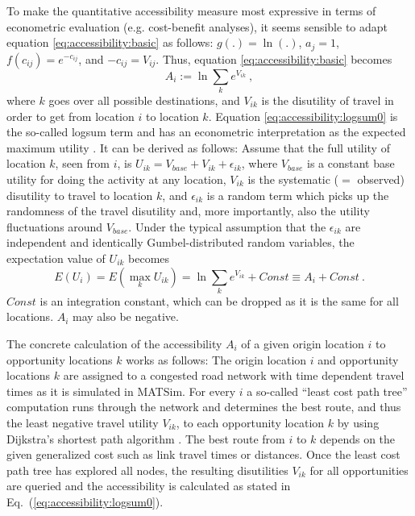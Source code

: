 To make the quantitative accessibility measure most expressive in terms of econometric evaluation (e.g. cost-benefit analyses), it seems sensible to adapt equation \ref{eq:accessibility:basic} as follows: $g(.) = \ln(.)$, $a_j = 1$, $f(c_{ij}) = e^{-c_{ij}}$, and $-c_{ij} = V_{ij}$. Thus, equation \ref{eq:accessibility:basic} becomes
\begin{equation}
A_i := \ln \sum_k e^{V_{ik}} \ ,
\label{eq:accessibility:logsum0}
\end{equation}
where $k$ goes over all possible destinations, and $V_{ik}$ is the
disutility of travel in order to get from location $i$ to location
$k$. Equation \ref{eq:accessibility:logsum0} is the so-called logsum term and has an econometric interpretation as the expected maximum utility \citep[e.g.][]{Ben-AkivaBook}. It can be derived as follows: Assume that the full utility of location $k$, seen from $i$, is $U_{ik} = V_{base} + V_{ik} + \epsilon_{ik}$, where $V_{base}$ is a constant base utility for doing the activity at any location, $V_{ik}$ is the systematic ($=$ observed) disutility to travel to location $k$, and $\epsilon_{ik}$ is a random term which picks up the randomness of the travel disutility and, more importantly, also the utility fluctuations around $V_{base}$.  Under the typical assumption that the $\epsilon_{ik}$ are independent and identically Gumbel-distributed random variables, the expectation value of $U_{ik}$ becomes
\begin{equation}
E(U_i) = E(\max_k U_{ik}) = \ln \sum_k e^{V_{ik}} + Const \equiv A_i + Const \ .
\end{equation}
$Const$ is an integration constant, which can be dropped as it is the same for all locations. $A_i$ may also be negative.

The concrete calculation of the accessibility $A_i$ of a given origin location $i$ to opportunity locations $k$ works as follows: The origin location $i$ and opportunity locations $k$ are assigned to a congested road network with time dependent travel times as it is simulated in MATSim. For every $i$ a so-called ``least cost path tree'' computation runs through the network and determines the best route, and thus the least negative travel utility $V_{ik}$, to each opportunity location $k$ by using Dijkstra's shortest path algorithm \citep{Dijkstra1959ShortestPath}. The best route from $i$ to $k$ depends on the given generalized cost such as link travel times or distances. Once the least cost path tree has explored all nodes, the resulting disutilities $V_{ik}$ for all opportunities are queried and the accessibility is calculated as stated in Eq.~(\ref{eq:accessibility:logsum0}).


